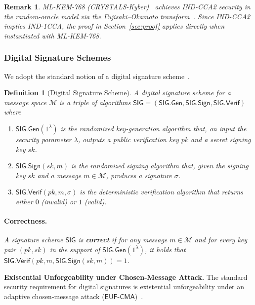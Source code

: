 \documentclass[runningheads]{llncs}
\newtheorem{defn}{Definition}[]
\newtheorem{rmk}{Remark}[]
\newcommand{\verif}{\mathsf{Verif}}
\begin{document}
\begin{rmk}
ML-KEM-768 (CRYSTALS-Kyber)~\cite{NIST:FIPS203} achieves IND-CCA2 security in the random-oracle model via the Fujisaki--Okamoto transform~\cite{JC:FujOka13}. Since IND-CCA2 implies IND-1CCA, the proof in Section~\ref{sec:proof} applies directly when instantiated with ML-KEM-768.
\end{rmk}

\subsubsection{Digital Signature Schemes}
We adopt the standard notion of a digital signature scheme~\cite{GolMicRiv88}.

\begin{defn}[Digital Signature Scheme] \label{def:sig}
A digital signature scheme for a message space $\mathcal{M}$ is a triple of algorithms $\mathsf{SIG} = (\mathsf{SIG.Gen}, \mathsf{SIG.Sign}, \mathsf{SIG.\verif})$ where
\begin{enumerate}
    \item $\mathsf{SIG.Gen}(1^{\lambda})$ is the randomized key-generation algorithm that, on input the security parameter $\lambda$, outputs a public verification key $pk$ and a secret signing key $sk$.
    \item $\mathsf{SIG.Sign}(sk, m)$ is the randomized signing algorithm that, given the signing key $sk$ and a message $m \in \mathcal{M}$, produces a signature $\sigma$.
    \item $\mathsf{SIG.\verif}(pk, m, \sigma)$ is the deterministic verification algorithm that returns either $0$ (invalid) or $1$ (valid).
\end{enumerate}

\paragraph{Correctness.}
A signature scheme $\mathsf{SIG}$ is \textbf{correct} if for any message $m \in \mathcal{M}$ and for every key pair $(pk, sk)$ in the support of $\mathsf{SIG.Gen}(1^{\lambda})$, it holds that $\mathsf{SIG.\verif}(pk, m, \mathsf{SIG.Sign}(sk, m)) = 1$.
\end{defn}

\noindent\textbf{Existential Unforgeability under Chosen-Message Attack.}
The standard security requirement for digital signatures is existential unforgeability under an adaptive chosen-message attack ($\mathsf{EUF}\text{-}\mathsf{CMA}$)~\cite{GolMicRiv88}.
\end{document}
